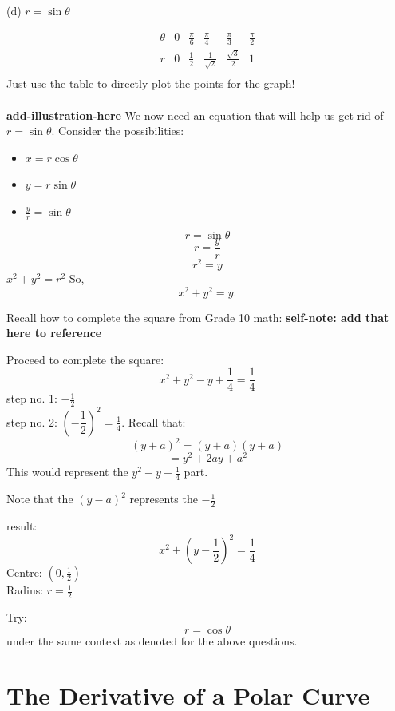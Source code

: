 \documentclass{article}
\begin{document}
(d) \( r = \sin\theta \)
\begin{solutionbox}
\[
\begin{array}{c|c|c|c|c|c}
\theta & 0 & \frac{\pi}{6} & \frac{\pi}{4} & \frac{\pi}{3} & \frac{\pi}{2} \\
\hline
r & 0 & \frac{1}{2} & \frac{1}{\sqrt{2}} & \frac{\sqrt{3}}{2} & 1 \\
\end{array}
\]
Just use the table to directly plot the points for the graph! \\
\\
\textbf{add-illustration-here}
We now need an equation that will help us get rid of \( r = \sin\theta \). Consider the possibilities:
\begin{itemize}
    \item \( x = r\cos\theta \)
    \item \( y = r\sin\theta \)
    \item \( \frac{y}{r} = \sin\theta \)
\end{itemize}

\[
    r = \sin\theta
\]
\[
    r = \frac{y}{r}
\]
\[
    r^2 = y
\]
\( x^2 + y^2 = r^2 \)
So,
\[
    x^2 + y^2 = y \text{.}
\]
\begin{propositionbox}
Recall how to complete the square from Grade 10 math:
\textbf{self-note: add that here to reference}
\end{propositionbox}
Proceed to complete the square:
\[
    x^2 + y^2 - y + \frac{1}{4} = \frac{1}{4}
\]
step no. 1: \( -\frac{1}{2} \) \\
step no. 2: \( (-\dfrac{1}{2})^2 = \frac{1}{4} \).
Recall that:
\[
    (y + a)^2 = (y + a)(y + a)
\]
\[
    = y^2 + 2ay + a^2
\]
This would represent the \( y^2 - y + \frac{1}{4} \) part.

Note that the \( (y - a)^2 \) represents the \( -\frac{1}{2} \) 

result:
\[
    x^2 + (y - \frac{1}{2})^2 = \frac{1}{4}
\]
Centre: \( (0, \frac{1}{2}) \) \\
Radius: \( r = \frac{1}{2} \) \\

\end{solutionbox}

\begin{exercisebox}
Try:
\[
    r = \cos\theta
\]
under the same context as denoted for the above questions.
\end{exercisebox}

\section*{The Derivative of a Polar Curve}
\end{document}
